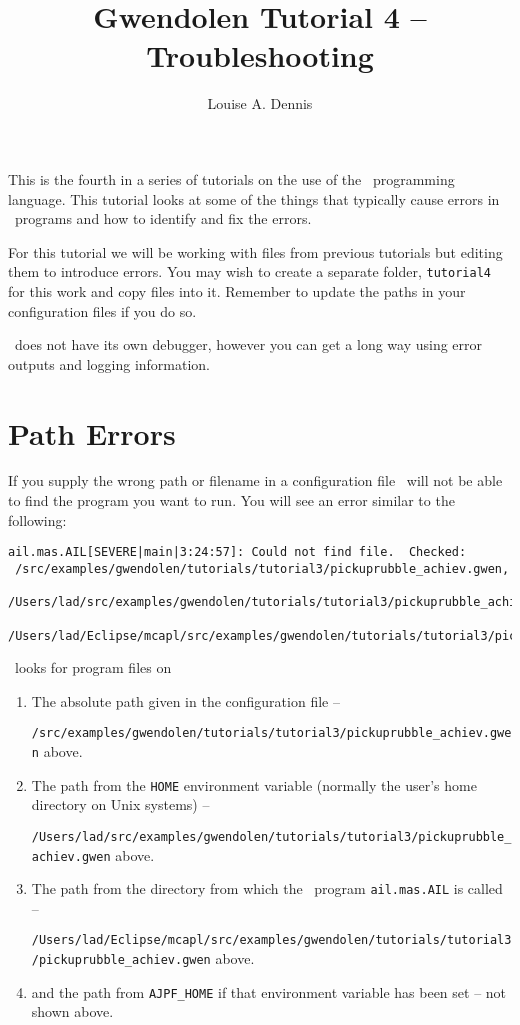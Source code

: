 \documentclass[a4]{article}
\author{Louise A. Dennis}
\title{Gwendolen Tutorial 4 -- Troubleshooting}
\begin{document}
\maketitle
This is the fourth in a series of tutorials on the use of the \gwendolen\ programming language.  This tutorial looks at some of the things that typically cause errors in \gwendolen\ programs and how to identify and fix the errors.

For this tutorial we will be working with files from previous tutorials but editing them to introduce errors.  You may wish to create a separate folder, \texttt{tutorial4} for this work and copy files into it.  Remember to update the paths in your configuration files if you do so.

\gwendolen\ does not have its own debugger, however you can get a long way using error outputs and logging information.

\section{Path Errors}
If you supply the wrong path or filename in a configuration file \gwendolen\ will not be able to find the program you want to run.  You will see an error similar to the following: 
\begin{verbatim}
ail.mas.AIL[SEVERE|main|3:24:57]: Could not find file.  Checked: 
 /src/examples/gwendolen/tutorials/tutorial3/pickuprubble_achiev.gwen,
 /Users/lad/src/examples/gwendolen/tutorials/tutorial3/pickuprubble_achiev.gwen,
 /Users/lad/Eclipse/mcapl/src/examples/gwendolen/tutorials/tutorial3/pickuprubble_achiev.gwen 
\end{verbatim}

\gwendolen\ looks for program files on
\begin{enumerate}
\item The absolute path given in the configuration file -- 

\texttt{/src/examples/gwendolen/tutorials/tutorial3/pickuprubble\_achiev.gwen} above.
\item The path from the \texttt{HOME} environment variable (normally the user's home directory on Unix systems) -- 

\texttt{/Users/lad/src/examples/gwendolen/tutorials/tutorial3/pickuprubble\_achiev.gwen} above.
\item The path from the directory from which the \java\ program \texttt{ail.mas.AIL} is called  -- 

\texttt{/Users/lad/Eclipse/mcapl/src/examples/gwendolen/tutorials/tutorial3/pickuprubble\_achiev.gwen} above.
\item and the path from \texttt{AJPF\_HOME} if that environment variable has been set -- not shown above.
\end{enumerate}
\end{document}
